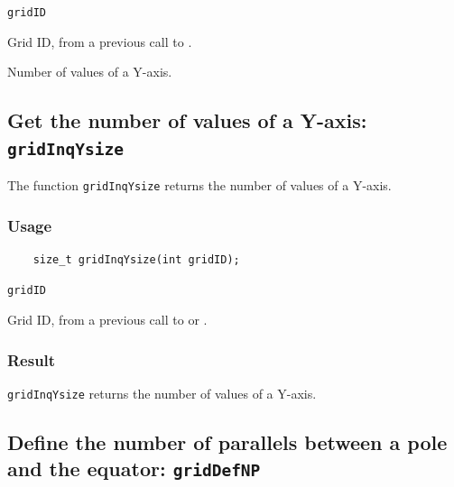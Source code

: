 \hspace*{4mm}\begin{minipage}[]{15cm}
\begin{deflist}{\texttt{gridID}\ }
\item[\texttt{gridID}]
Grid ID, from a previous call to {}.
\item[\texttt{ysize}]
Number of values of a Y-axis.

\end{deflist}
\end{minipage}


\subsection{Get the number of values of a Y-axis: \texttt{gridInqYsize}}
\label{gridInqYsize}

The function {\texttt{gridInqYsize}} returns the number of values of a Y-axis.

\subsubsection*{Usage}

\begin{verbatim}
    size_t gridInqYsize(int gridID);
\end{verbatim}

\hspace*{4mm}\begin{minipage}[]{15cm}
\begin{deflist}{\texttt{gridID}\ }
\item[\texttt{gridID}]
Grid ID, from a previous call to {} or {}.

\end{deflist}
\end{minipage}

\subsubsection*{Result}

{\texttt{gridInqYsize}} returns the number of values of a Y-axis.



\subsection{Define the number of parallels between a pole and the equator: \texttt{gridDefNP}}
\label{gridDefNP}


